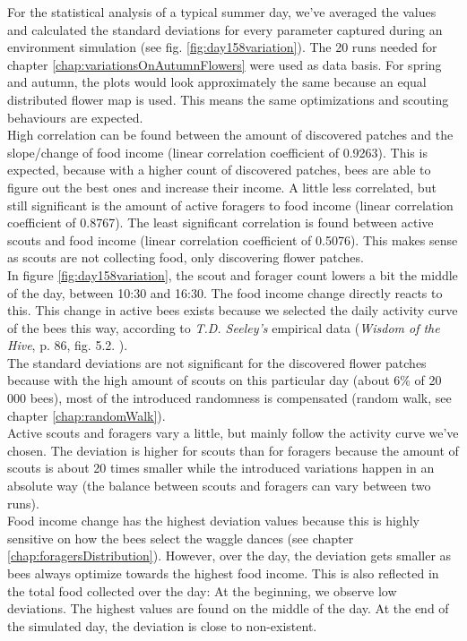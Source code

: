 		For the statistical analysis of a typical summer day, we've averaged the values and calculated the standard deviations for every parameter captured during an environment simulation (see fig. \ref{fig:day158variation}). The 20 runs needed for chapter \ref{chap:variationsOnAutumnFlowers} were used as data basis. For spring and autumn, the plots would look approximately the same because an equal distributed flower map is used. This means the same optimizations and scouting behaviours are expected.\\
		High correlation can be found between the amount of discovered patches and the slope/change of food income (linear correlation coefficient of 0.9263). This is expected, because with a higher count of discovered patches, bees are able to figure out the best ones and increase their income.
		A little less correlated, but still significant is the amount of active foragers to food income (linear correlation coefficient of 0.8767). The least significant correlation is found between active scouts and food income (linear correlation coefficient of 0.5076). This makes sense as scouts are not collecting food, only discovering flower patches.\\
		In figure \ref{fig:day158variation}, the scout and forager count lowers a bit the middle of the day, between 10:30 and 16:30. The food income change directly reacts to this. This change in active bees exists because we selected the daily activity curve of the bees this way, according to \textit{T.D. Seeley's} empirical data (\textit{Wisdom of the Hive}, p. 86, fig. 5.2. \cite{seeley95}).\\
		
		The standard deviations are not significant for the discovered flower patches because with the high amount of scouts on this particular day (about 6\% of 20 000 bees), most of the introduced randomness is compensated (random walk, see chapter \ref{chap:randomWalk}).\\
		Active scouts and foragers vary a little, but mainly follow the activity curve we've chosen. The deviation is higher for scouts than for foragers because the amount of scouts is about 20 times smaller while the introduced variations happen in an absolute way (the balance between scouts and foragers can vary between two runs).\\
		Food income change has the highest deviation values because this is highly sensitive on how the bees select the waggle dances (see chapter \ref{chap:foragersDistribution}). However, over the day, the deviation gets smaller as bees always optimize towards the highest food income. This is also reflected in the total food collected over the day: At the beginning, we observe low deviations. The highest values are found on the middle of the day. At the end of the simulated day, the deviation is close to non-existent.
		
